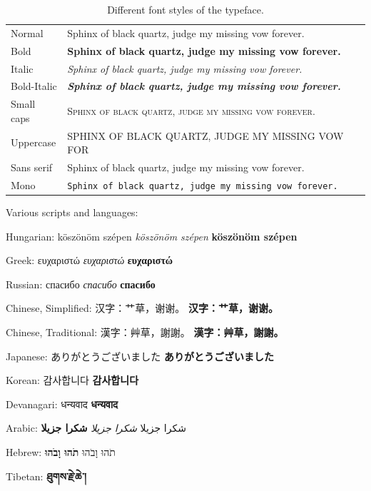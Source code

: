 \begin{table}
\begin{tabular}{@{}lll@{}}
\toprule
Normal      & Sphinx of black quartz, judge my missing vow forever. \\
Bold        & \textbf{Sphinx of black quartz, judge my missing vow forever.} \\
Italic      & \textit{Sphinx of black quartz, judge my missing vow forever.} \\
Bold-Italic & \textbf{\textit{Sphinx of black quartz, judge my missing vow forever.}} \\
Small caps  & \textsc{Sphinx of black quartz, judge my missing vow forever.} \\
Uppercase   & \uppercase{Sphinx of black quartz, judge my missing vow for} \\
Sans serif  & \textsf{Sphinx of black quartz, judge my missing vow forever.} \\
Mono        & \texttt{Sphinx of black quartz, judge my missing vow forever.} \\ \bottomrule
\end{tabular}
\caption{Different font styles of the typeface.}
\end{table}

\bigskip

Various scripts and languages:

Hungarian: köszönöm szépen \textit{köszönöm szépen} \textbf{köszönöm szépen}

Greek: ευχαριστώ \textit{ευχαριστώ} \textbf{ευχαριστώ}

Russian: спасибо \textit{спасибо} \textbf{спасибо}

Chinese, Simplified: 汉字：艹草，谢谢。 \textbf{汉字：艹草，谢谢。}

Chinese, Traditional: 漢字：艸草，謝謝。 \textbf{漢字：艸草，謝謝。}

Japanese: ありがとうございました \textbf{ありがとうございました }

Korean: 감사합니다 \textbf{감사합니다}

\textnormal
Devanagari: धन्यवाद \textbf{धन्यवाद}

Arabic: شكرا جزيلا  \textit{شكرا جزيلا} \textbf{شكرا جزيلا}

\textnormal
Hebrew: תֹהוּ וָבֹהוּ \textbf{תֹהוּ וָבֹהוּ} 

Tibetan: { \textbf{ཐུགས་རྗེ་ཆེ་།}}

